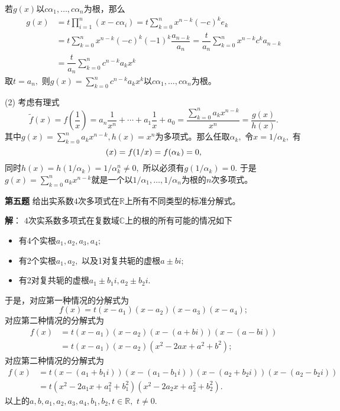 若$g(x)$以$c\alpha_1, \ldots, c\alpha_n$为根，那么
\begin{align*}
g(x) & = t \prod\limits_{i=1}^n (x - c\alpha_i) = t \sum\limits_{k=0}^n x^{n-k} (-c)^k e_k \\
& = t \sum\limits_{k=0}^n x^{n-k} (-c)^k (-1)^k \dfrac{a_{n-k}}{a_n} = \dfrac{t}{a_n} \sum\limits_{k=0}^n x^{n-k} c^k a_{n-k} \\
& = \dfrac{t}{a_n} \sum\limits_{k=0}^n c^{n-k} a_k x^k
\end{align*}
取$t = a_n,$ 则$g(x) = \sum\limits_{k=0}^n c^{n-k} a_k x^k$以$c\alpha_1, \ldots, c\alpha_n$为根。

(2) 考虑有理式
$$\tilde{f}(x) = f \left( \dfrac{1}{x} \right) = a_n \dfrac{1}{x^n} + \cdots + a_1 \dfrac{1}{x} + a_0 = \dfrac{\sum\limits_{k=0}^n a_k x^{n-k}}{x^n} = \dfrac{g(x)}{h(x)}.$$
其中$g(x) = \sum\limits_{k=0}^n a_k x^{n-k}, h(x) = x^n$为多项式。那么任取$\alpha_k,$ 令$x = 1/\alpha_k,$ 有
$$\title{f}(x) = f(1/x) = f(\alpha_k) = 0,$$
同时$h(x) = h(1/\alpha_k) = 1/\alpha_k^n \neq 0,$ 所以必须有$g(1/\alpha_k) = 0.$ 于是$g(x) = \sum\limits_{k=0}^n a_k x^{n-k}$就是一个以$1/\alpha_1, \ldots, 1/\alpha_n$为根的$n$次多项式。

\fi  %

\newpageorvspace

{\bf 第五题} 给出实系数$4$次多项式在$\mathbb{R}$上所有不同类型的标准分解式。

\ifIncludeAnswer

\newpageorvspace

{\bf 解}： $4$次实系数多项式在复数域$\mathbb{C}$上的根的所有可能的情况如下
\begin{itemize}
\item 有4个实根$a_1, a_2, a_3, a_4;$
\item 有2个实根$a_1, a_2,$ 以及1对复共轭的虚根$a \pm bi;$
\item 有2对复共轭的虚根$a_1 \pm b_1i, a_2 \pm b_2i.$
\end{itemize}
于是，对应第一种情况的分解式为
$$f(x) = t(x-a_1)(x-a_2)(x-a_3)(x-a_4);$$
对应第二种情况的分解式为
\begin{align*}
f(x) & = t(x-a_1)(x-a_2)(x-(a + bi))(x-(a - bi)) \\
& = t(x-a_1)(x-a_2)(x^2-2ax+a^2+b^2);
\end{align*}
对应第二种情况的分解式为
\begin{align*}
f(x) & = t(x-(a_1 + b_1i))(x-(a_1 - b_1i))(x-(a_2 + b_2i))(x-(a_2 - b_2i)) \\
& = t(x^2-2a_1x+a_1^2+b_1^2)(x^2-2a_2x+a_2^2+b_2^2).
\end{align*}
以上的$a, b, a_1, a_2, a_3, a_4, b_1, b_2, t \in \mathbb{R},$ $t \neq 0.$


